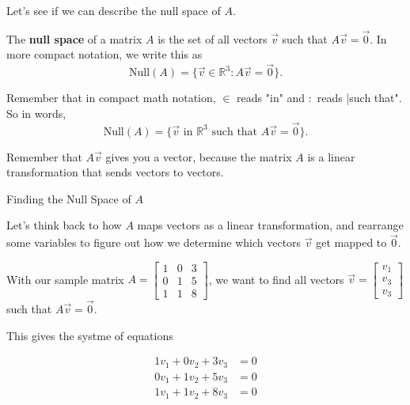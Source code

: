 \documentclass{ximera}
\begin{document}
Let's see if we can describe the null space of $A$.

\begin{definition}

    The {\bf null space} of a matrix $A$ is the set of all vectors $\vec{v}$ such that $A\vec{v} = \vec{0}$. In more compact notation, we write this as 
    $$\text{Null}(A) = \{ \vec{v} \in \mathbb{R}^3 : A\vec{v} = \vec{0} \}.$$

    \begin{hint}

        Remember that in compact math notation, $\in$ reads "in" and $:$ reads |such that". So in words, $$\text{Null}(A) = \{ \vec{v} \text{ in } \mathbb{R}^3 \text{ such that } A\vec{v} = \vec{0} \}.$$

        Remember that $A\vec{v}$ gives you a vector, because the matrix $A$ is a linear transformation that sends vectors to vectors.

    \end{hint}

\end{definition}


\begin{exploration}{Finding the Null Space of $A$}

Let's think back to how $A$ maps vectors as a linear transformation, and rearrange some variables to figure out how we determine which vectors $\vec{v}$ get mapped to $\vec{0}$. 

With our sample matrix $A=\begin{bmatrix} 1 & 0 & 3 \\ 0 & 1 & 5 \\ 1 & 1 & 8 \end{bmatrix}$, we want to find all vectors $\vec{v} = \begin{bmatrix} v_1 \\ v_3 \\ v_3 \end{bmatrix}$ such that $A\vec{v} = \vec{0}$.

This gives the systme of equations

\[
\begin{aligned}
    1v_1 + 0v_2 + 3v_3 &= 0 \\
    0v_1 + 1v_2 + 5v_3 &= 0 \\
    1v_1 + 1v_2 + 8v_3 &= 0
\end{aligned}
\]


\end{exploration}
\end{document}
